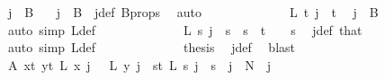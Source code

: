\begin{isabellebody}
\ {\isachardoublequoteopen}j\ {\isasymin}\ B\ {}{\isachardoublequoteclose}\ \isamarkupfalse%
\ {\isacartoucheopen}j\ {\isasymnotin}\ B\ {}{\isacartoucheclose}\ j{\isacharunderscore}{\kern0pt}def\ B{\isacharunderscore}{\kern0pt}props\ \isamarkupfalse%
\ auto\isanewline
\isanewline
\ \ \ \ \ \ \ \ \ \ \isamarkupfalse%
\ \isamarkupfalse%
\ {\isachardoublequoteopen}L{\isacharprime}{\kern0pt}\ t\ j\ {\isacharequal}{\kern0pt}\ t{\isachardoublequoteclose}\ \isamarkupfalse%
\ {\isacartoucheopen}j\ {\isasymnotin}\ B\ {}{\isacartoucheclose}\ \isamarkupfalse%
\ {\isacharparenleft}{\kern0pt}auto\ simp{\isacharcolon}{\kern0pt}\ L{\isacharprime}{\kern0pt}{\isacharunderscore}{\kern0pt}def{\isacharparenright}{\kern0pt}\isanewline
\ \ \ \ \ \ \ \ \ \ \isamarkupfalse%
\ \isamarkupfalse%
\ {\isachardoublequoteopen}L{\isacharprime}{\kern0pt}\ s\ j\ {\isacharequal}{\kern0pt}\ s{\isachardoublequoteclose}\ \ {\isachardoublequoteopen}s\ {\isacharless}{\kern0pt}\ t\ {\isacharplus}{\kern0pt}\ {}{\isachardoublequoteclose}\ \ s\ \isamarkupfalse%
\ j{\isacharunderscore}{\kern0pt}def\ that\ \isamarkupfalse%
\ {\isacharparenleft}{\kern0pt}auto\ simp{\isacharcolon}{\kern0pt}\ L{\isacharprime}{\kern0pt}{\isacharunderscore}{\kern0pt}def{\isacharparenright}{\kern0pt}\isanewline
\ \ \ \ \ \ \ \ \ \ \isamarkupfalse%
\ \isamarkupfalse%
\ {\isacharquery}{\kern0pt}thesis\ \isamarkupfalse%
\ j{\isacharunderscore}{\kern0pt}def\ \isamarkupfalse%
\ blast\isanewline
\ \ \ \ \ \ \ \ \isamarkupfalse%
\isanewline
\ \ \ \ \ \ \isamarkupfalse%
\isanewline
\ \ \ \ \ \ \isamarkupfalse%
\ A{}{\isacharcolon}{\kern0pt}\ {\isachardoublequoteopen}{\isacharparenleft}{\kern0pt}{\isasymforall}x{\isacharless}{\kern0pt}t{\isacharplus}{\kern0pt}{}{\isachardot}{\kern0pt}\ {\isasymforall}y{\isacharless}{\kern0pt}t{\isacharplus}{\kern0pt}{}{\isachardot}{\kern0pt}\ L{\isacharprime}{\kern0pt}\ x\ j\ {\isacharequal}{\kern0pt}\ \ L{\isacharprime}{\kern0pt}\ y\ j{\isacharparenright}{\kern0pt}\ {\isasymor}\ {\isacharparenleft}{\kern0pt}{\isasymforall}s{\isacharless}{\kern0pt}t{\isacharplus}{\kern0pt}{}{\isachardot}{\kern0pt}\ L{\isacharprime}{\kern0pt}\ s\ j\ {\isacharequal}{\kern0pt}\ s{\isacharparenright}{\kern0pt}{\isachardoublequoteclose}\ \ {\isachardoublequoteopen}j\ {\isacharless}{\kern0pt}\ N{\isacharprime}{\kern0pt}{\isachardoublequoteclose}\ \ j\ \isanewline

\end{isabellebody}
